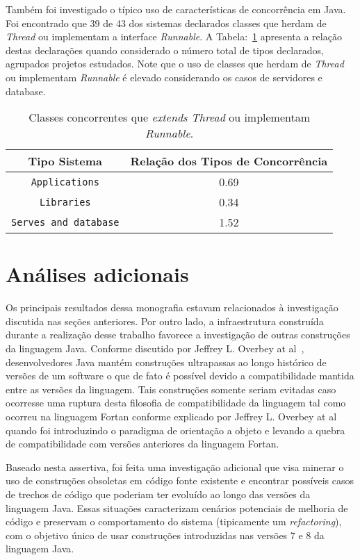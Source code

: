 Também foi investigado o típico uso de características de concorrência em Java. Foi encontrado que 39 de 43 dos sistemas declarados classes que herdam de \textit{Thread} ou implementam a interface \textit{Runnable}. A Tabela:~\ref{tab:concorrenciaJava} apresenta a relação destas declarações quando considerado o número total de tipos declarados, agrupados projetos estudados. Note que o uso de classes que herdam de \textit{Thread} ou implementam \textit{Runnable} é elevado considerando os casos de servidores e database.

\begin{table}[h]
	\centering
	\caption{Classes concorrentes que \textit{extends Thread} ou implementam \textit{Runnable}.}
	\begin{tabular}{cc}
		\hline
		Tipo Sistema & Relação dos Tipos de Concorrência\\ 
		\hline \hline
		\texttt{Applications} & 0.69 \\ 
		\texttt{Libraries} & 0.34 \\ 
		\texttt{Serves and database} & 1.52 \\ \hline
	\end{tabular}
	\label{tab:concorrenciaJava} %
\end{table}

\section{Análises adicionais}
Os principais resultados dessa monografia estavam relacionados à investigação discutida nas seções anteriores. Por outro lado, a infraestrutura construída  durante a realização desse trabalho favorece a investigação de outras construções da linguagem Java. Conforme discutido por Jeffrey L. Overbey at al~\cite{Overbey:2009}, desenvolvedores Java mantém construções ultrapassas ao longo histórico de versões de um  software o que de fato é possível devido a compatibilidade mantida entre as versões da linguagem. Tais construções somente seriam evitadas caso ocorresse uma ruptura desta filosofia de compatibilidade da linguagem tal como ocorreu na linguagem Fortan conforme explicado por Jeffrey L. Overbey at al~\cite{Overbey:2009} quando foi  introduzindo o paradigma de orientação a objeto e levando a quebra de compatibilidade com versões anteriores da linguagem Fortan.

Baseado nesta assertiva, foi feita uma investigação adicional que visa minerar o uso de construções obsoletas 
em código fonte existente e encontrar possíveis casos de trechos de código que poderiam ter evoluído ao longo das versões da linguagem Java. Essas situações caracterizam cenários potenciais de melhoria de código e preservam 
o comportamento do sistema (tipicamente um \textit{refactoring}), com o objetivo único de usar construções introduzidas nas versões 7 e 8 da linguagem Java.

